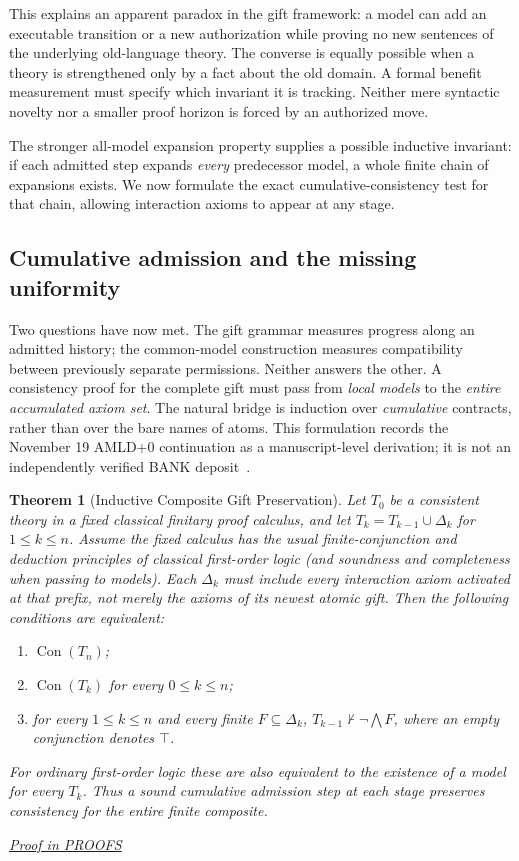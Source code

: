 \documentclass[11pt,letterpaper]{article}
\newtheorem{theorem}{Theorem}[section]
\theoremstyle{definition}\newtheorem{definition}[theorem]{Definition}\newtheorem{example}[theorem]{Example}
\theoremstyle{remark}\newtheorem{remark}[theorem]{Remark}
\newcommand{\Con}{\operatorname{Con}}
\newcommand{\prooflink}[1]{\par\noindent\hfill\small\hyperref[#1]{\textit{Proof in PROOFS}}\normalsize}
\begin{document}
This explains an apparent paradox in the gift framework: a model can add an executable transition or a new authorization while proving no new sentences of the underlying old-language theory. The converse is equally possible when a theory is strengthened only by a fact about the old domain. A formal benefit measurement must specify which invariant it is tracking. Neither mere syntactic novelty nor a smaller proof horizon is forced by an authorized move.


The stronger all-model expansion property supplies a possible inductive
invariant: if each admitted step expands \emph{every} predecessor model, a
whole finite chain of expansions exists. We now formulate the exact
cumulative-consistency test for that chain, allowing interaction axioms to
appear at any stage.

\subsection{Cumulative admission and the missing uniformity}
Two questions have now met. The gift grammar measures progress along an
admitted history; the common-model construction measures compatibility
between previously separate permissions. Neither answers the other.
A consistency proof for the complete gift must pass from \emph{local models}
to the \emph{entire accumulated axiom set}.  The natural bridge is induction over \emph{cumulative}
contracts, rather than over the bare names of atoms.  This formulation records the
November 19 AMLD+0 continuation as a manuscript-level derivation; it is not an
independently verified BANK deposit~\cite{amldledger}.

\begin{theorem}[Inductive Composite Gift Preservation]\label{br:th:inductive}
Let $T_0$ be a consistent theory in a fixed classical finitary proof calculus, and
let $T_k=T_{k-1}\cup\Delta_k$ for $1\le k\le n$. Assume the fixed
calculus has the usual finite-conjunction and deduction principles of
classical first-order logic (and soundness and completeness when passing to
models). Each $\Delta_k$ must include
\emph{every} interaction axiom activated at that prefix, not merely the axioms
of its newest atomic gift.  Then the following conditions are equivalent:
\begin{enumerate}[label=\textup{(\roman*)}]
\item $\Con(T_n)$;
\item $\Con(T_k)$ for every $0\le k\le n$;
\item for every $1\le k\le n$ and every finite $F\subseteq\Delta_k$,
$T_{k-1}\not\vdash\neg\bigwedge F$, where an empty conjunction denotes $\top$.
\end{enumerate}
For ordinary first-order logic these are also equivalent to the existence of a
model for every $T_k$. Thus a sound cumulative admission step at each stage
preserves consistency for the entire finite composite.
\prooflink{br:pr:inductive}
\end{theorem}
\end{document}

